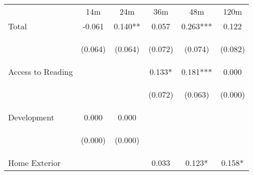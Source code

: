 \begin{tabular}{lccccc}
\hline \noalign{\smallskip} & 14m & 24m & 36m & 48m & 120m\\
\noalign{\smallskip}\hline \noalign{\smallskip}Total & -0.061 & 0.140** & 0.057 & 0.263*** & 0.122\\
 & \begin{footnotesize}(0.064)\end{footnotesize} & \begin{footnotesize}(0.064)\end{footnotesize} & \begin{footnotesize}(0.072)\end{footnotesize} & \begin{footnotesize}(0.074)\end{footnotesize} & \begin{footnotesize}(0.082)\end{footnotesize}\\
\noalign{\smallskip}Access to Reading &  &  & 0.133* & 0.181*** & 0.000\\
 & \begin{footnotesize}\end{footnotesize} & \begin{footnotesize}\end{footnotesize} & \begin{footnotesize}(0.072)\end{footnotesize} & \begin{footnotesize}(0.063)\end{footnotesize} & \begin{footnotesize}(0.000)\end{footnotesize}\\
\noalign{\smallskip}Development & 0.000 & 0.000 &  &  & \\
 & \begin{footnotesize}(0.000)\end{footnotesize} & \begin{footnotesize}(0.000)\end{footnotesize} & \begin{footnotesize}\end{footnotesize} & \begin{footnotesize}\end{footnotesize} & \begin{footnotesize}\end{footnotesize}\\
\noalign{\smallskip}Home Exterior &  &  & 0.033 & 0.123* & 0.158*\\

\end{tabular}
